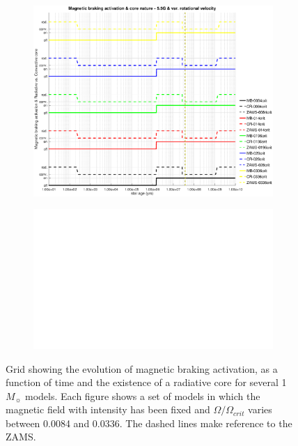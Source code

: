 \documentclass[fleqn,usenatbib]{mnras}
\begin{document}
\begin{figure}
\begin{subfigure}[h]{0.47\textwidth}
    \includegraphics[trim = 30mm 15mm 20mm 15mm, clip,width=\textwidth]{figures/mb_act_var_vel_5_5g.eps}
    \label{fig:subim35}
    \end{subfigure}
    \begin{subfigure}[h]{0.47\textwidth}
    \includegraphics[width=\textwidth]{figures/blank.eps}
    \label{fig:subim36}
    \end{subfigure}
\caption{Grid showing the evolution of magnetic braking activation, as a function of time and the existence of a radiative core for several 1 $M_{\sun}$ models. Each figure shows a set of models in which the magnetic field with intensity has been fixed and $\Omega / \Omega_{crit}$ varies between 0.0084 and 0.0336. The dashed lines make reference to the ZAMS.}
\label{fig:image32}
\end{figure}
\end{document}

